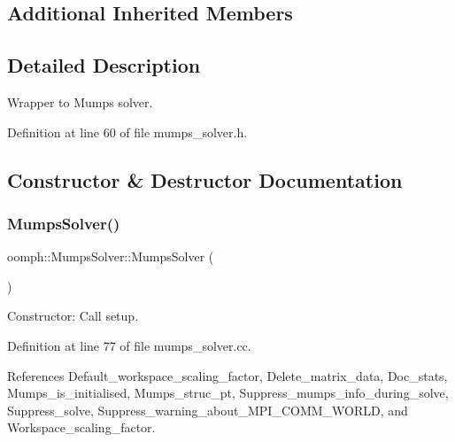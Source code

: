 \subsection*{Additional Inherited Members}


\subsection{Detailed Description}
Wrapper to Mumps solver. 

Definition at line 60 of file mumps\+\_\+solver.\+h.



\subsection{Constructor \& Destructor Documentation}
\mbox{\label{classoomph_1_1MumpsSolver_ac3f965da46774f48a9b756610f81140e}} 
\subsubsection{\texorpdfstring{Mumps\+Solver()}{MumpsSolver()}\hspace{0.1cm}{\footnotesize\ttfamily [1/2]}}
{\footnotesize\ttfamily oomph\+::\+Mumps\+Solver\+::\+Mumps\+Solver (\begin{DoxyParamCaption}{ }\end{DoxyParamCaption})}



Constructor\+: Call setup. 



Definition at line 77 of file mumps\+\_\+solver.\+cc.



References Default\+\_\+workspace\+\_\+scaling\+\_\+factor, Delete\+\_\+matrix\+\_\+data, Doc\+\_\+stats, Mumps\+\_\+is\+\_\+initialised, Mumps\+\_\+struc\+\_\+pt, Suppress\+\_\+mumps\+\_\+info\+\_\+during\+\_\+solve, Suppress\+\_\+solve, Suppress\+\_\+warning\+\_\+about\+\_\+\+M\+P\+I\+\_\+\+C\+O\+M\+M\+\_\+\+W\+O\+R\+LD, and Workspace\+\_\+scaling\+\_\+factor.

\mbox{\label{classoomph_1_1MumpsSolver_a0f70542a7e29c3e2dce02a8516e796f6}} 
